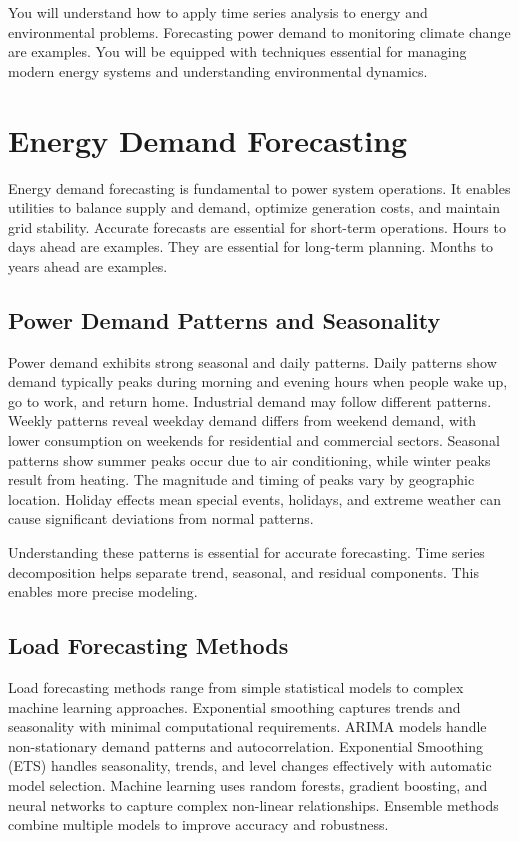 You will understand how to apply time series analysis to energy and environmental problems. Forecasting power demand to monitoring climate change are examples. You will be equipped with techniques essential for managing modern energy systems and understanding environmental dynamics.

\section{Energy Demand Forecasting}

Energy demand forecasting is fundamental to power system operations. It enables utilities to balance supply and demand, optimize generation costs, and maintain grid stability. Accurate forecasts are essential for short-term operations. Hours to days ahead are examples. They are essential for long-term planning. Months to years ahead are examples.

\subsection{Power Demand Patterns and Seasonality}

Power demand exhibits strong seasonal and daily patterns. Daily patterns show demand typically peaks during morning and evening hours when people wake up, go to work, and return home. Industrial demand may follow different patterns. Weekly patterns reveal weekday demand differs from weekend demand, with lower consumption on weekends for residential and commercial sectors. Seasonal patterns show summer peaks occur due to air conditioning, while winter peaks result from heating. The magnitude and timing of peaks vary by geographic location. Holiday effects mean special events, holidays, and extreme weather can cause significant deviations from normal patterns.

Understanding these patterns is essential for accurate forecasting. Time series decomposition helps separate trend, seasonal, and residual components. This enables more precise modeling.

\subsection{Load Forecasting Methods}

Load forecasting methods range from simple statistical models to complex machine learning approaches. Exponential smoothing captures trends and seasonality with minimal computational requirements. ARIMA models handle non-stationary demand patterns and autocorrelation. Exponential Smoothing (ETS) handles seasonality, trends, and level changes effectively with automatic model selection. Machine learning uses random forests, gradient boosting, and neural networks to capture complex non-linear relationships. Ensemble methods combine multiple models to improve accuracy and robustness.


